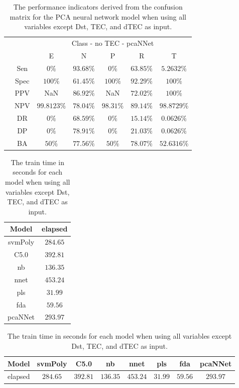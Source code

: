 \begin{table}[!ht]
	\centering
	\begin{tabular}{|c|c|c|c|c|c|c|}
		\cline{3-7}
		\multicolumn{2}{c|}{} & \multicolumn{5}{c|}{Class - no TEC - pcaNNet} \\ \cline{3-7}
		\multicolumn{2}{c|}{} & E & N & P & R & T \\ \hline
		\multirow{7}{*}{\rotatebox{90}{Statistics}} & Sen & $0\%$ & $93.68\%$ & $0\%$ & $63.85\%$ & $5.2632\%$ \\ \cline{2-7}
		 & Spec & $100\%$ & $61.45\%$ & $100\%$ & $92.29\%$ & $100\%$ \\ \cline{2-7}
		 & PPV & NaN & $86.92\%$ & NaN & $72.02\%$ & $100\%$ \\ \cline{2-7}
		 & NPV & $99.8123\%$ & $78.04\%$ & $98.31\%$ & $89.14\%$ & $98.8729\%$ \\ \cline{2-7}
		 & DR & $0\%$ & $68.59\%$ & $0\%$ & $15.14\%$ & $0.0626\%$ \\ \cline{2-7}
		 & DP & $0\%$ & $78.91\%$ & $0\%$ & $21.03\%$ & $0.0626\%$ \\ \cline{2-7}
		 & BA & $50\%$ & $77.56\%$ & $50\%$ & $78.07\%$ & $52.6316\%$ \\ \hline
	\end{tabular}
	\caption{The performance indicators derived from the confusion matrix for the PCA neural network model when using all variables except Dst, TEC, and dTEC as input.}
	\label{tab:cs:reverse:noTEC:pcaNNet}
\end{table}

\begin{table}[!ht]
	\centering
	\begin{tabular}{|c|c|}
		\hline
		Model & elapsed \\ \hline
		svmPoly & $284.65$ \\ \hline
		C5.0 & $392.81$ \\ \hline
		nb & $136.35$ \\ \hline
		nnet & $453.24$ \\ \hline
		pls & $31.99$ \\ \hline
		fda & $59.56$ \\ \hline
		pcaNNet & $293.97$ \\ \hline
	\end{tabular}
	\caption{The train time in seconds for each model when using all variables except Dst, TEC, and dTEC as input.}
	\label{tab:time:noTEC:train}
\end{table}

\begin{table}[!ht]
	\centering
	\begin{tabular}{|c|c|c|c|c|c|c|c|}
		\hline
		Model & svmPoly & C5.0 & nb & nnet & pls & fda & pcaNNet \\ \hline
		elapsed & $284.65$ & $392.81$ & $136.35$ & $453.24$ & $31.99$ & $59.56$ & $293.97$ \\ \hline
	\end{tabular}
	\caption{The train time in seconds for each model when using all variables except Dst, TEC, and dTEC as input.}
	\label{tab:time:reverse:noTEC:train}
\end{table}


